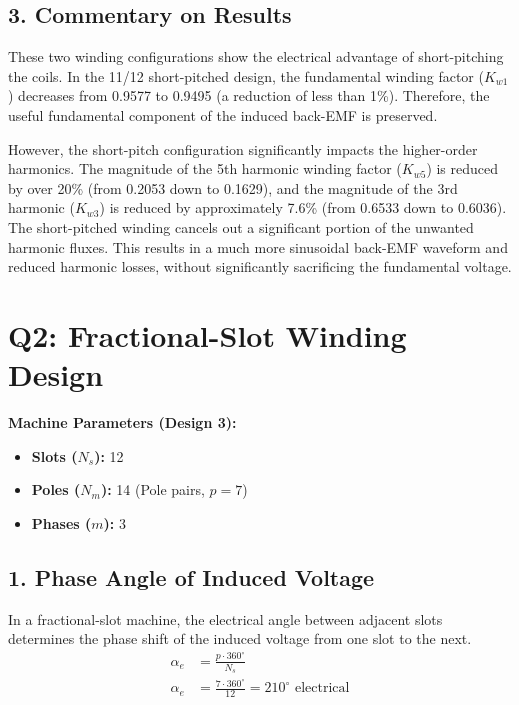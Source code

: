 \documentclass{article}
\begin{document}
\subsection*{3. Commentary on Results}

These two winding configurations show the electrical advantage of short-pitching the coils. In the 11/12 short-pitched design, the fundamental winding factor ($K_{w1}$) decreases from 0.9577 to 0.9495 (a reduction of less than 1\%). Therefore, the useful fundamental component of the induced back-EMF is preserved.

However, the short-pitch configuration significantly impacts the higher-order harmonics. The magnitude of the 5th harmonic winding factor ($K_{w5}$) is reduced by over 20\% (from 0.2053 down to 0.1629), and the magnitude of the 3rd harmonic ($K_{w3}$) is reduced by approximately 7.6\% (from 0.6533 down to 0.6036). The short-pitched winding cancels out a significant portion of the unwanted harmonic fluxes. This results in a much more sinusoidal back-EMF waveform and reduced harmonic losses, without significantly sacrificing the fundamental voltage.

\section*{Q2: Fractional-Slot Winding Design}

\noindent
\textbf{Machine Parameters (Design 3):}
\begin{itemize}
    \item \textbf{Slots ($N_s$):} 12
    \item \textbf{Poles ($N_m$):} 14 (Pole pairs, $p = 7$)
    \item \textbf{Phases ($m$):} 3
\end{itemize}

\hrulefill

\subsection*{1. Phase Angle of Induced Voltage}

In a fractional-slot machine, the electrical angle between adjacent slots determines the phase shift of the induced voltage from one slot to the next.
\begin{align*}
    \alpha_e &= \frac{p \cdot 360^\circ}{N_s} \\
    \alpha_e &= \frac{7 \cdot 360^\circ}{12} = 210^\circ \text{ electrical}
\end{align*}
\end{document}
